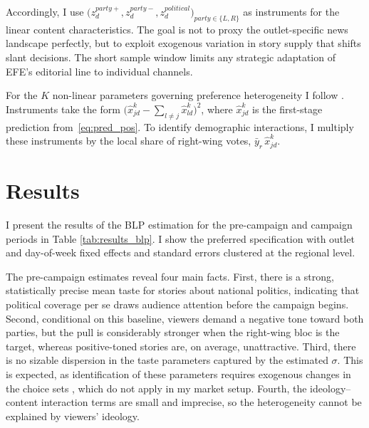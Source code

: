 \documentclass[12pt]{article}
\begin{document}
	
	
	
	Accordingly, I use
	$\bigl(z_d^{party+},z_d^{party-},z_d^{political}\bigr)_{party\in\{L,R\}}$
	as instruments for the linear content characteristics.  The goal is not to proxy the outlet-specific news landscape perfectly, but to exploit exogenous variation in story supply that shifts slant decisions.  
	The short sample window limits any strategic adaptation of EFE’s editorial line to individual channels.
	
	For the $K$ non-linear parameters governing preference heterogeneity I follow \citet{gandhi2019measuring}.  
	Instruments take the form
	$\bigl(\hat{x}_{jd}^k-\sum_{l\neq j}\hat{x}_{ld}^k\bigr)^2$,
	where $\hat{x}_{jd}^k$ is the first-stage prediction from~\eqref{eq:pred_pos}.
	To identify demographic interactions, I multiply these instruments by the local share of right-wing votes, $\bar y_r\,\hat{x}_{jd}^k$.


	\section{Results}
	
	\label{section:results}
	
	I present the results of the BLP estimation for the pre-campaign and campaign periods in Table \ref{tab:results_blp}. I show the preferred specification with outlet and day-of-week fixed effects and standard errors clustered at the regional level.
	
	The pre-campaign estimates reveal four main facts. First, there is a strong, statistically precise mean taste for stories about national politics, indicating that political coverage per se draws audience attention before the campaign begins. Second, conditional on this baseline, viewers demand a negative tone toward both parties, but the pull is considerably stronger when the right-wing bloc is the target, whereas positive-toned stories are, on average, unattractive. Third, there is no sizable dispersion in the taste parameters captured by the estimated $\sigma$. This is expected, as identification of these parameters requires exogenous changes in the choice sets \citep{berry_haile}, which do not apply in my market setup. Fourth, the ideology–content interaction terms are small and imprecise, so the heterogeneity cannot be explained by viewers’ ideology.
	
\end{document}
